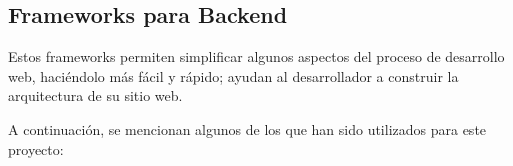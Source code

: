 \subsection{Frameworks para Backend}
Estos frameworks permiten simplificar algunos aspectos del proceso de desarrollo web, haciéndolo más fácil y rápido; ayudan al desarrollador a construir la arquitectura de su sitio web.

A continuación, se mencionan algunos de los que han sido utilizados para este proyecto: 
    
    
